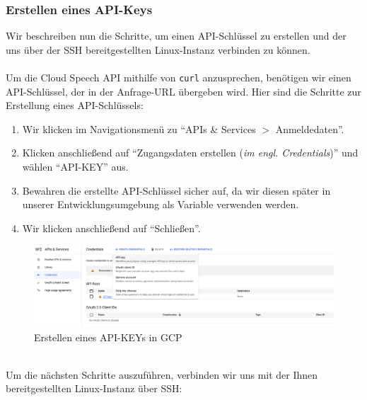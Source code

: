 \documentclass[12pt,a4paper]{article}
\begin{document}
\subsubsection{Erstellen eines API-Keys}
Wir beschreiben nun die Schritte, um einen API-Schlüssel zu erstellen und der uns über der SSH bereitgestellten Linux-Instanz verbinden zu können.
\\ \\
Um die Cloud Speech API mithilfe von \texttt{curl} anzusprechen, benötigen wir einen API-Schlüssel, der in der Anfrage-URL übergeben wird. Hier sind die Schritte zur Erstellung eines API-Schlüssels:
\begin{enumerate}
	\item Wir klicken im Navigationsmenü zu \enquote{APIs \& Services $>$ Anmeldedaten}.
	
	\item Klicken anschließend auf \enquote{Zugangsdaten erstellen (\textit{im engl. Credentials})} und wählen \enquote{API-KEY} aus.
	
	\item Bewahren die erstellte API-Schlüssel sicher auf, da wir diesen später in unserer Entwicklungsumgebung als Variable verwenden werden.
	
	\item Wir klicken anschließend auf \enquote{Schließen}.
\end{enumerate}
\begin{figure}[h!]
	\centering
	\includegraphics[width=1\linewidth]{../images/GCP_CREATE_API}
	\caption{Erstellen eines API-KEYs in GCP}
	\label{fig:gcpcreateapi}
\end{figure}
\ \\
Um die nächsten Schritte auszuführen, verbinden wir uns mit der Ihnen bereitgestellten Linux-Instanz über SSH:
\end{document}
